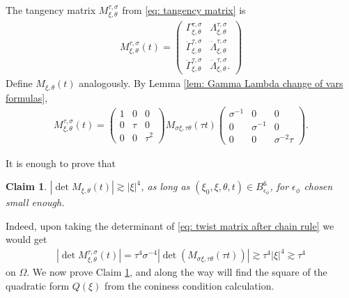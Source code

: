 \documentclass[12pt]{amsart}
\numberwithin{equation}{section}
\newtheorem{claim}[lemma]{Claim}
\newcommand{\1}{\mathbbm{1}}
\newcommand{\Bphi}{B_{\epsilon_\phi}}
\begin{document}
The tangency matrix $M^{\tau,\sigma}_{\xi, \theta}$ from \eqref{eq: tangency matrix} is 
\begin{align}
    M^{\tau, \sigma}_{\xi, \theta}(t) = 
    \begin{pmatrix}
        \Gamma_{\xi, \theta}^{\tau, \sigma} &\Lambda_{\xi,\theta}^{\tau, \sigma} \\
        \dot \Gamma_{\xi, \theta}^{\tau, \sigma} &\dot \Lambda_{\xi,\theta}^{\tau, \sigma} \\
        \ddot \Gamma_{\xi, \theta}^{\tau, \sigma} &\ddot \Lambda_{\xi,\theta}^{\tau, \sigma}.
    \end{pmatrix}
\end{align}
Define $M_{\xi,\theta}(t)$ analogously. By Lemma \ref{lem: Gamma Lambda change of vars formulas},
\begin{align}\label{eq: twist matrix after chain rule}
    M^{\tau, \sigma}_{\xi,\theta}(t) = 
    \begin{pmatrix}
        1 & 0 & 0 \\
        0 & \tau & 0 \\
        0 & 0& \tau^2
    \end{pmatrix}
    M_{\sigma \xi, \tau \theta}(\tau t) 
    \begin{pmatrix}
        \sigma^{-1} & 0 & 0\\
        0 & \sigma^{-1} & 0\\
        0 & 0 & \sigma^{-2} \tau
    \end{pmatrix}.
\end{align}

It is enough to prove that 
\begin{claim}\label{claim: twist calculation}
    $|\det M_{\xi,\theta}(t)| \gtrsim |\xi|^4$, as long as $(\xi_0, \xi, \theta, t) \in \Bphi^6$, for $\epsilon_\phi$ chosen small enough. 
\end{claim}

Indeed, upon taking the determinant of \eqref{eq: twist matrix after chain rule} we would get 
\begin{align}
    |\det M_{\xi,\theta}^{\tau, \sigma}(t)| = \tau^4 \sigma^{-4} |\det(M_{\sigma\xi,\tau\theta}(\tau t))| \gtrsim \tau^4 |\xi|^4 \gtrsim \tau^4
\end{align}
on $\Omega$. We now prove Claim \ref{claim: twist calculation}, and along the way will find the square of the quadratic form $Q(\xi)$ from the coniness condition calculation. 
\end{document}
